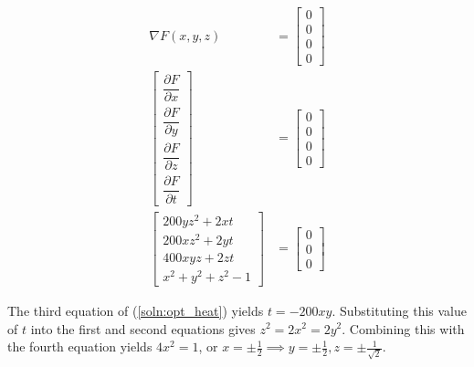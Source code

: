 \begin{align}
 \nabla F(x,y,z) &= \begin{bmatrix} 0 \\ 0 \\ 0 \\ 0 \end{bmatrix} \nonumber \\
 \begin{bmatrix}
  \dfrac{\partial F}{\partial x} \\
  \dfrac{\partial F}{\partial y} \\
  \dfrac{\partial F}{\partial z} \\
  \dfrac{\partial F}{\partial t}
 \end{bmatrix} &= \begin{bmatrix} 0 \\ 0 \\ 0 \\ 0 \end{bmatrix} \nonumber \\
 \begin{bmatrix}
  200yz^2 + 2xt \\
  200xz^2 + 2yt \\
  400xyz + 2zt \\
  x^2 + y^2 + z^2 - 1
 \end{bmatrix} &= \begin{bmatrix} 0 \\ 0 \\ 0 \end{bmatrix} \label{soln:opt_heat}
\end{align}

The third equation of (\ref{soln:opt_heat}) yields $t = -200xy$.  Substituting
this value of $t$ into the first and second equations gives $z^2 = 2x^2 = 2y^2$.
Combining this with the fourth equation yields $4x^2 = 1$, or
$x = \pm \frac{1}{2} \implies y = \pm \frac{1}{2}, z = \pm \frac{1}{\sqrt{2}}$.



\EEN

